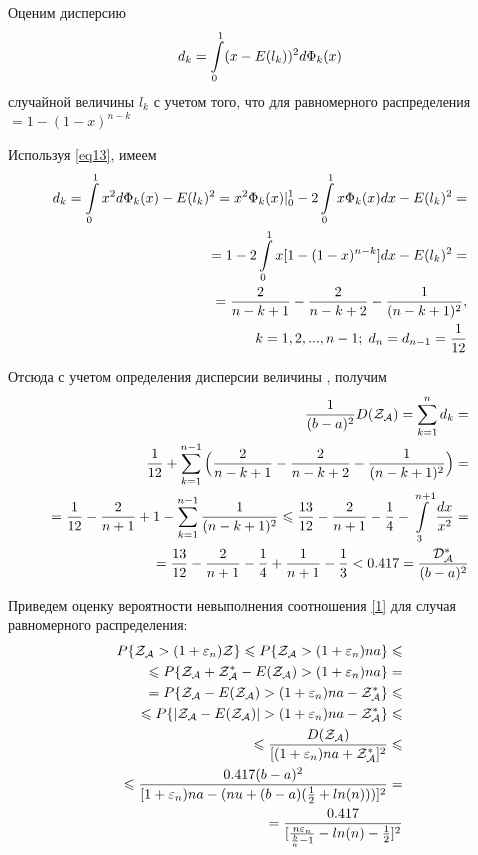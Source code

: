 \documentclass[a4paper, 14pt]{extarticle}
\numberwithin{equation}{section}
\begin{document}
Оценим дисперсию
\begin{equation*}
d_k=\int\limits_0^1 (x-E(l_k))^2 d\text{$\Phi_k(x)$}
\end{equation*}
случайной величины $l_k$ с учетом того, что для равномерного распределения \chanceLklesserX{} $ = 1-(1-x)^{n-k}$

Используя \eqref{eq13}, имеем
\begin{align*}
d_k = \int\limits_0^1 x^2 d \text{$\Phi_k(x)$}-E(l_k)^2=x^2 \text{$\Phi_k(x)$} 	
|_0^1 - 2 \int\limits_0^1 x \text{$\Phi_k(x)$}dx - E(l_k)^2=\\
= 1-2\int\limits_0^1 x[1-(1-x)^{n-k}]dx-E(l_k)^2 =\\
= \frac{2}{n-k+1} - \frac{2}{n-k+2} - \frac{1}{(n-k+1)^2}, \\ 
\; k=1,2,...,n-1; \; d_n = d_{n-1} = \frac{1}{12}
\end{align*}

Отсюда с учетом определения дисперсии величины \randomvalue{} , получим
\begin{equation*}
\begin{aligned}
\frac{1}{(b-a)^2} \text{$D(\text{$\mathcal{Z_{A}}$})$} = \sum_{k=1}^n d_k = \\
 \frac{1}{12} + \sum_{k=1}^{n-1} \Big(\frac{2}{n-k+1} - \frac{2}{n-k+2} - \frac{1}{(n-k+1)^2} \Big) = \\
= \frac{1}{12} - \frac{2}{n+1} +1 - \sum_{k=1}^{n-1} \frac{1}{(n-k+1)^2} \leqslant \frac{13}{12} - \frac{2}{n+1} - \frac{1}{4} - \int\limits_3^{n+1} \frac{dx}{x^2} = \\
= \frac{13}{12} - \frac{2}{n+1} - \frac{1}{4} + \frac{1}{n+1} - \frac{1}{3} < 0.417 = \frac{\text{$\mathcal{D^*_{A}}$}}{(b-a)^2} 
\end{aligned}
\end{equation*}

Приведем оценку вероятности невыполнения соотношения \eqref{1} для случая равномерного распределения:
\begin{equation}\label{14}
\begin{aligned}
P\{ \text{$\mathcal{Z_{A}}$} > (1+\varepsilon_n) \mathcal{Z} \} \leqslant P\{ \text{$\mathcal{Z_{A}}$} > (1+\varepsilon_n)na \} \leqslant \\
\leqslant P\{ \text{$\mathcal{Z_{A}}$} + \text{$\mathcal{Z^*_{A}}$} - \text{$E(\text{$\mathcal{Z_{A}}$})$} > (1+\varepsilon_n)na \} = \\
= P \{ \text{$\mathcal{Z_{A}}$} - \text{$E(\text{$\mathcal{Z_{A}}$})$} > (1+\varepsilon_n)na - \text{$\mathcal{Z^*_{A}}$} \} \leqslant \\
\leqslant P \{ |\text{$\mathcal{Z_{A}}$} - \text{$E(\text{$\mathcal{Z_{A}}$})$}| > (1+\varepsilon_n)na - \text{$\mathcal{Z^*_{A}}$} \} \leqslant \\
\leqslant \frac{\text{$D(\text{$\mathcal{Z_{A}}$})$}}{[(1+\varepsilon_n)na + \text{$\mathcal{Z^*_{A}}$}]^2} \leqslant \\
\leqslant \frac{0.417(b-a)^2}{[1+\varepsilon_n)na-(nu+(b-a)(\frac{1}{2}+ln(n)))]^2} = \\
= \frac{0.417}{[\frac{n\varepsilon_n}{\frac{b}{a}-1}-ln(n) -\frac{1}{2}]^2}
\end{aligned}
\end{equation}
\end{document}
